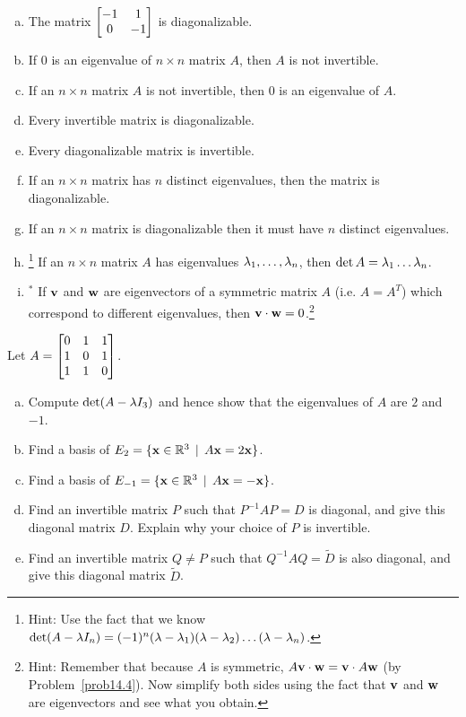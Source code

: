 \begin{prob}
\begin{enumerate}[a)]
\item The matrix $\bmatrix -1&1\\0&-1\endbmatrix$ is
diagonalizable.
\medskip
%
\item\sov If $0$ is an eigenvalue of  $n \times n$ matrix  $A$, then $A$ is
not invertible.
\medskip
%
\item If an  $n \times n$ matrix  $A$ is
not invertible, then $0$ is an eigenvalue of $A$.
\medskip
%
\item\sov Every invertible matrix is diagonalizable.
\medskip
%
\item Every diagonalizable  matrix is invertible.
\medskip
%
\item\sov If an $n \times n$ matrix has $n$ distinct eigenvalues, then the matrix is diagonalizable. 
\medskip
%
\item If an $n \times n$ matrix is diagonalizable then it must have $n$ distinct eigenvalues. 
\medskip
%
\item\sov\footnote{ Hint: Use the fact that we know $\det(A-\lambda I_n)=(-1)^n(\lambda-\lambda_1)(\lambda-\lambda_2)\dots(\lambda-\lambda_n) $.} If an  $n \times n$ matrix  $A$ has eigenvalues $\lambda_1, \dots ,\lambda_n$, then $\det A=\lambda_1 \dots\lambda_n $.
\medskip
%

\item$^{\ast}$ If $\mathbf{v}$ and $\mathbf{w}$ are eigenvectors of a symmetric matrix $A$ (i.e. $A=A^T$) which correspond to different eigenvalues, then $\mathbf{v} \cdot \mathbf{w}=0$.\footnote{ Hint:  Remember that because $A$ is symmetric, $A\mathbf{v}\cdot \mathbf{w}=\mathbf{v}\cdot A\mathbf{w}$ (by Problem~\ref{prob14.4}). Now simplify both sides using the fact that $\mathbf{v}$ and $\mathbf{w}$ are eigenvectors and see what you obtain.}
\medskip
% 
\end{enumerate}
\end{prob} \begin{prob} \label{prob23.3}\sov Let $A=\bmatrix
0&1&1\\ 1&0&1\\ 1&1&0 \endbmatrix$. 

\begin{enumerate}[a)]

\item Compute $\det(A-\lambda I_3)$ and hence show that the eigenvalues of
$A$ are $2$ and $-1$.

\item Find a basis of $E_2 =\{\mathbf{x}\in \mathbb{R}^3 \,\mid \, A\mathbf{x}= 2\mathbf{x} \}$.
\item Find a basis of $E_{-1} =\{\mathbf{x}\in \mathbb{R}^3 \,\mid \, A\mathbf{x}=-\mathbf{x} \}$. 
 
\item Find an invertible  matrix 
$P$ such that $P^{-1}AP=D$ is diagonal,  and give this diagonal matrix $D$. Explain why
your choice of $P$ is invertible.
\item Find an invertible  matrix 
$Q \not=P$ such that $Q^{-1}AQ=\tilde D$ is also diagonal,  and give this diagonal matrix $\tilde D$.
\end{enumerate}
  



\end{prob}
